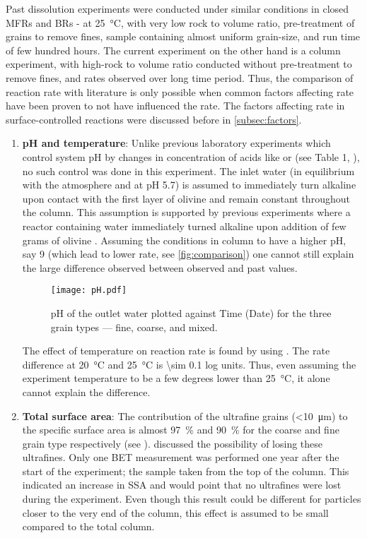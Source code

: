 Past dissolution experiments were conducted under similar conditions in closed MFRs and BRs - at \SI{25}{\degreeCelsius}, with very low rock to volume ratio, pre-treatment of grains to remove fines, sample containing almost uniform grain-size, and run time of few hundred hours. The current experiment on the other hand is a column experiment, with high-rock to volume ratio conducted without pre-treatment to remove fines, and rates observed over long time period. Thus, the comparison of reaction rate with literature is only possible when common factors affecting rate have been proven to not have influenced the rate. The factors affecting rate in surface-controlled reactions were discussed before in \cref{subsec:factors}.
 
\begin{enumerate}
\item \textbf{pH and temperature}: Unlike previous laboratory experiments which control system pH by changes in concentration of acids like  or  (see Table 1, \citep{rimstidt2012}), no such control was done in this experiment. The inlet water (in equilibrium with the atmosphere and at pH 5.7) is assumed to immediately turn alkaline upon contact with the first layer of olivine and remain constant throughout the column. This assumption is supported by previous experiments where a reactor containing water immediately turned alkaline upon addition of few grams of olivine \citep{martinez2014,dessen2016}. Assuming the conditions in column to have a higher pH, say 9 (which lead to lower rate, see \cref{fig:comparison}) one cannot still explain the large difference observed between observed and past values.\\

\begin{figure}[h]
 \centering
 \texttt{[image: pH.pdf]}
 \caption{pH of the outlet water plotted against Time (Date) for the three grain types --- fine, coarse, and mixed.}
 \label{fig:results_ph}
 \end{figure}
 
\noindent The effect of temperature on reaction rate is found by using . The rate difference at \SI{20}{\degreeCelsius} and \SI{25}{\degreeCelsius} is \num{\sim 0.1} log units. Thus, even assuming the experiment temperature to be a few degrees lower than \SI{25}{\degreeCelsius}, it alone cannot explain the difference.

\item \textbf{Total surface area}: The contribution of the ultrafine grains (\SI{<10}{\micro\meter}) to the specific surface area is almost \SI{97}{\percent} and \SI{90}{\percent} for the  coarse and fine grain type respectively (see ).  discussed the  possibility of losing these ultrafines. Only one BET measurement was performed one year after the start of the experiment; the sample taken from the top of the column. This indicated an increase in SSA and would point that no ultrafines were lost during the experiment. Even though this result could be different for particles closer to the very end of the column, this effect is assumed to be small compared to the total column.


\end{enumerate}
